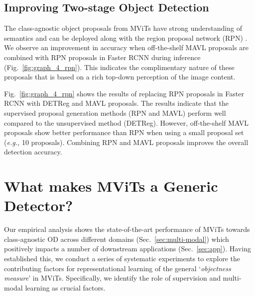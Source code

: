 \documentclass[runningheads]{llncs}
\def\eg{\emph{e.g.,}\xspace} \def\Eg{\emph{E.g.}\xspace}
\begin{document}
\subsection{Improving Two-stage Object Detection}
The class-agnostic object proposals from MViTs have strong understanding of semantics and can be deployed along with the region proposal network (RPN) \cite{ren2015faster}. We observe an improvement in accuracy when off-the-shelf MAVL proposals are combined with RPN proposals in Faster RCNN \cite{ren2015faster} during inference (Fig.~\ref{fig:graph_4_rpn}). This indicates the complimentary nature of these proposals that is based on a rich top-down perception of the image content. 

Fig.~\ref{fig:graph_4_rpn} shows the results of replacing RPN proposals in Faster RCNN with DETReg \cite{detreg} and MAVL proposals. The results indicate that the supervised proposal generation methods (RPN and MAVL) perform well compared to the unsupervised method (DETReg). However, off-the-shelf MAVL proposals show better performance than RPN when using a small proposal set (\eg 10 proposals). Combining RPN and MAVL proposals improves the overall detection accuracy. 

\section{What makes MViTs a Generic Detector?}\label{sec:what}
Our empirical analysis shows the state-of-the-art performance of MViTs towards class-agnostic OD across different domains (Sec.~\ref{sec:multi-modal}) which positively impacts a number of downstream applications (Sec.~\ref{sec:app}). Having established this, we conduct a series of systematic experiments to explore the  contributing factors for representational learning of the general ‘\emph{objectness measure}’ in MViTs. Specifically, we identify the role of supervision and multi-modal learning as crucial factors.
\end{document}
